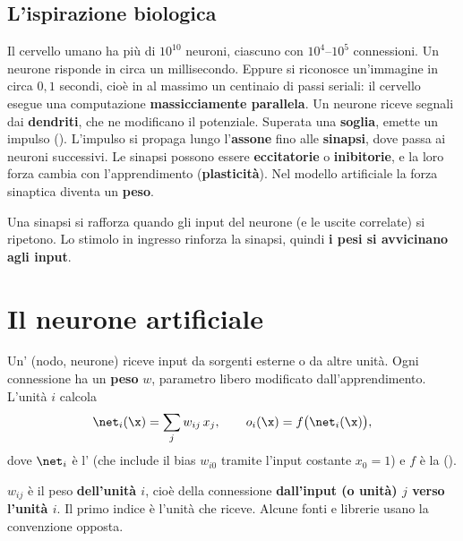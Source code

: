 \subsection{L'ispirazione biologica}

Il cervello umano ha più di $10^{10}$ neuroni, ciascuno con $10^4$--$10^5$ connessioni. Un neurone risponde in
circa un millisecondo. Eppure si riconosce un'immagine in circa $0{,}1$ secondi, cioè in al massimo un centinaio
di passi seriali: il cervello esegue una computazione \textbf{massicciamente parallela}. Un neurone riceve
segnali dai \textbf{dendriti}, che ne modificano il potenziale. Superata una \textbf{soglia}, emette un impulso
(). L'impulso si propaga lungo l'\textbf{assone} fino alle \textbf{sinapsi}, dove passa ai neuroni
successivi. Le sinapsi possono essere \textbf{eccitatorie} o \textbf{inibitorie}, e la loro forza cambia con
l'apprendimento (\textbf{plasticità}). Nel modello artificiale la forza sinaptica diventa un \textbf{peso}.

\begin{definizione}
Una sinapsi si rafforza quando gli input del neurone (e le uscite correlate) si ripetono. Lo stimolo in ingresso
rinforza la sinapsi, quindi \textbf{i pesi si avvicinano agli input}.
\end{definizione}

\section{Il neurone artificiale}
\label{sec:neurone}

Un' (nodo, neurone) riceve input da sorgenti esterne o da altre unità. Ogni connessione ha un
\textbf{peso} $w$, parametro libero modificato dall'apprendimento. L'unità $i$ calcola
\begin{equation}\label{eq:neurone}
\net_i(\x) = \sum_j w_{ij}\,x_j, \qquad o_i(\x) = f\big(\net_i(\x)\big),
\end{equation}
dove $\net_i$ è l' (che include il bias $w_{i0}$ tramite l'input costante $x_0=1$) e $f$ è la
 ().

\begin{attenzione}
$w_{ij}$ è il peso \textbf{dell'unità $i$}, cioè della connessione \textbf{dall'input (o unità) $j$ verso l'unità
$i$}. Il primo indice è l'unità che riceve. Alcune fonti e librerie usano la convenzione opposta.
\end{attenzione}

